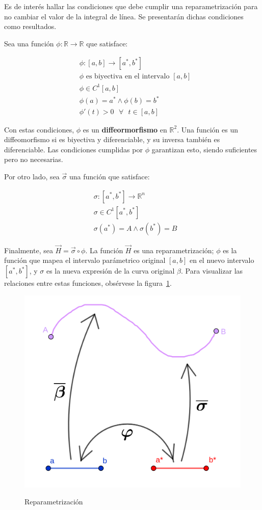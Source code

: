 \documentclass{article}
\renewcommand{\Bbb}{\mathbb}
\begin{document}
Es de interés hallar las condiciones que debe cumplir una reparametrización para no cambiar el valor de la integral de línea. Se presentarán dichas condiciones como resultados.

Sea una función $\phi:\Bbb R \rightarrow \Bbb R$ que satisface:

\begin{align}
&\phi:[a, b] \rightarrow [a^*, b^*] \\
&\phi \text{ es biyectiva en el intervalo } [a,b] \\
&\phi \in C^1[a,b] \\
&\phi(a) = a^* \wedge \phi(b) = b^* \\
&\phi'(t) > 0 \text{ } \forall \text{ } t \in [a,b]
\end{align}

Con estas condiciones, $\phi$ es un \textbf{diffeormorfismo} en $\Bbb R^2$. Una función es un diffeomorfismo si es biyectiva y diferenciable, y su inversa también es diferenciable. Las condiciones cumplidas por $\phi$ garantizan esto, siendo suficientes pero no necesarias. 

Por otro lado, sea $\overrightarrow{\sigma}$ una función que satisface:

\begin{align}
&\sigma: [a^*, b^*] \rightarrow \Bbb R^n \\
&\sigma\in C^1[a^*, b^*] \\
&\sigma(a^*) = A \wedge \sigma(b^*) = B
\end{align}

Finalmente, sea $\overrightarrow{H} = \overrightarrow{\sigma} \circ \phi$. La función $\overrightarrow{H}$ es una reparametrización; $\phi$ es la función que mapea el intervalo parámetrico original $[a,b]$ en el nuevo intervalo $[a^*, b^*]$, y $\sigma$ es la nueva expresión de la curva original $\beta$. Para visualizar las relaciones entre estas funciones, obsérvese la figura~\ref{fig:reparam}.

\begin{figure}[ht]
\centering
\caption{Reparametrización}
\includegraphics[scale=0.7]{img/teo_fig013_re.png}
\label{fig:reparam}
\end{figure}
\end{document}
